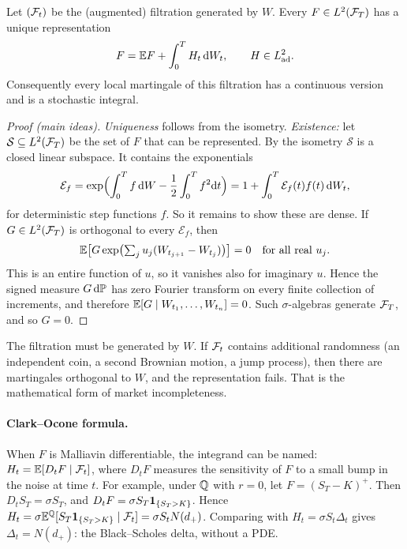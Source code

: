 \begin{theorem}\label{thm:mrt}
Let $(\mathcal{F}_t)$ be the (augmented) filtration generated by $W$. Every $F\in L^2(\mathcal{F}_T)$ has a unique representation
\[
F=\mathbb{E} F+\int_0^TH_t\,\mathrm{d} W_t,\qquad H\in L^2_{\rm ad}.
\]
Consequently every local martingale of this filtration has a continuous version and is a stochastic integral.
\end{theorem}
\begin{proof}[Proof (main ideas)]
\emph{Uniqueness} follows from the isometry. \emph{Existence:} let $\mathcal{S}\subseteq L^2(\mathcal{F}_T)$ be the set of $F$ that can be represented. By the isometry $\mathcal{S}$ is a closed linear subspace. It contains the exponentials
\[
\mathcal{E}_f=\exp\Bigl(\int_0^Tf\,\mathrm{d} W-\frac12\int_0^Tf^2\mathrm{d} t\Bigr)=1+\int_0^T\mathcal{E}_f(t)f(t)\,\mathrm{d} W_t,
\]
for deterministic step functions $f$. So it remains to show these are dense. If $G\in L^2(\mathcal{F}_T)$ is orthogonal to every $\mathcal{E}_f$, then
\[
\mathbb{E}\bigl[G\exp\bigl(\textstyle\sum_ju_j(W_{t_{j+1}}-W_{t_j})\bigr)\bigr]=0\quad\text{for all real }u_j.
\]
This is an entire function of $u$, so it vanishes also for imaginary $u$. Hence the signed measure $G\,\mathrm{d}\mathbb{P}$ has zero Fourier transform on every finite collection of increments, and therefore $\mathbb{E}[G\mid W_{t_1},\dots,W_{t_n}]=0$. Such $\sigma$-algebras generate $\mathcal{F}_T$, and so $G=0$.
\end{proof}

\begin{pitfall}
The filtration must be generated by $W$. If $\mathcal{F}_t$ contains additional randomness (an independent coin, a second Brownian motion, a jump process), then there are martingales orthogonal to $W$, and the representation fails. That is the mathematical form of market incompleteness.
\end{pitfall}

\paragraph{Clark--Ocone formula.} When $F$ is Malliavin differentiable, the integrand can be named: $H_t=\mathbb{E}[D_tF\mid\mathcal{F}_t]$, where $D_tF$ measures the sensitivity of $F$ to a small bump in the noise at time $t$. For example, under $\mathbb{Q}$ with $r=0$, let $F=(S_T-K)^+$. Then $D_tS_T=\sigma S_T$, and $D_tF=\sigma S_T\mathbf{1}_{\{S_T>K\}}$. Hence $H_t=\sigma\mathbb{E}^{\mathbb{Q}}[S_T\mathbf{1}_{\{S_T>K\}}\mid\mathcal{F}_t]=\sigma S_tN(d_+)$. Comparing with $H_t=\sigma S_t\Delta_t$ gives $\Delta_t=N(d_+)$: the Black--Scholes delta, without a PDE.

